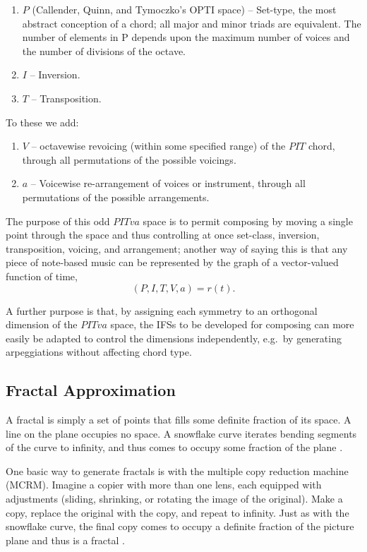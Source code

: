 \documentclass[english,11pt,letterpaper,onecolumn]{scrartcl}
\begin{document}
\begin{enumerate}
 \item $P$ (Callender, Quinn, and Tymoczko's OPTI space) -- Set-type, the most 
abstract conception of a chord; all major and minor triads are equivalent. The 
number of elements in P depends upon the maximum number of voices and the 
number of divisions of the octave.
 \item $I$ -- Inversion.
 \item $T$ -- Transposition.
\end{enumerate}

\noindent To these we add:

\begin{enumerate}[resume]
 \item $V$ -- octavewise revoicing (within some specified range) of the 
$PIT$ chord, through all permutations of the possible voicings.
 \item $a$ -- Voicewise re-arrangement of voices or instrument, through all
permutations of the possible arrangements.
\end{enumerate}

\noindent The purpose of this odd $PITva$ space is to permit composing by 
moving a single point through the space and thus controlling at once 
set-class, inversion, transposition, voicing, and arrangement; another way of 
saying this is that any piece of note-based music can be represented by the 
graph of a vector-valued function of time, $$(P, I, T, V, a) = 
r(t).$$

A further purpose is that, by assigning each symmetry to an orthogonal 
dimension of the $PITva$ space, the IFSs to be developed for composing can 
more easily be adapted to control the dimensions independently, e.g.\ by 
generating arpeggiations without affecting chord type.

\subsection{Fractal Approximation}

A fractal is simply a set of points that fills some definite fraction of its 
space. A line on the plane occupies no space. A snowflake curve iterates 
bending segments of the curve to infinity, and thus comes to occupy some 
fraction of the plane \cite{Mandelbrot:1982:FGN}.

One basic way to generate fractals is with the multiple copy reduction 
machine (MCRM). Imagine a copier with more than one lens, each equipped with 
adjustments (sliding, shrinking, or rotating the image of the original). Make 
a copy, replace the original with the copy, and repeat to infinity. Just as 
with the snowflake curve, the final copy comes to occupy a definite fraction 
of the picture plane and thus is a fractal \cite{chaosandfractals}. 
\end{document}
